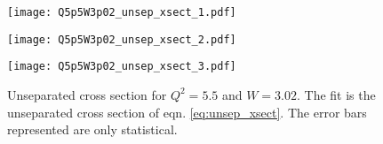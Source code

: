 \begin{figure}
  \centering
    \begin{minipage}[b]{0.48\linewidth}
      \texttt{[image: Q5p5W3p02\_unsep\_xsect\_1.pdf]}
    \end{minipage}
    \hfill
    \begin{minipage}[b]{0.48\linewidth}
      \texttt{[image: Q5p5W3p02\_unsep\_xsect\_2.pdf]}
    \end{minipage}
    \begin{minipage}[b]{0.48\linewidth}
      \texttt{[image: Q5p5W3p02\_unsep\_xsect\_3.pdf]}
    \end{minipage}
  \caption{Unseparated cross section for $Q^2=5.5$ and $W=3.02$. The fit is the unseparated cross section of eqn. \ref{eq:unsep_xsect}. The error bars represented are only statistical.}
  \label{fig:Q5p5W3p02_unsep_xsect}
\end{figure}

